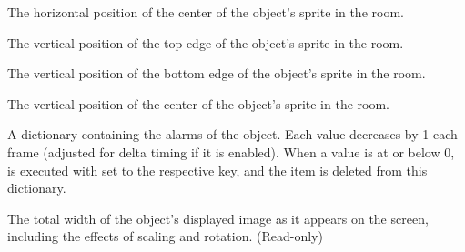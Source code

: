 \documentclass[letterpaper,10pt,english]{sphinxmanual}
\begin{document}
\begin{fulllineitems}
\begin{fulllineitems}
\label{dsp:sge.dsp.Object.image_xcenter}
The horizontal position of the center of the object's sprite in
the room.

\end{fulllineitems}


\begin{fulllineitems}
\label{dsp:sge.dsp.Object.image_top}
The vertical position of the top edge of the object's sprite in
the room.

\end{fulllineitems}


\begin{fulllineitems}
\label{dsp:sge.dsp.Object.image_bottom}
The vertical position of the bottom edge of the object's sprite
in the room.

\end{fulllineitems}


\begin{fulllineitems}
\label{dsp:sge.dsp.Object.image_ycenter}
The vertical position of the center of the object's sprite in the
room.

\end{fulllineitems}


\begin{fulllineitems}
\label{dsp:sge.dsp.Object.alarms}
A dictionary containing the alarms of the object.  Each value
decreases by 1 each frame (adjusted for delta timing if it is
enabled).  When a value is at or below 0, {\hyperref[dsp:sge.dsp.Object.event_alarm]{\emph{}}} is
executed with  set to the respective key, and the
item is deleted from this dictionary.

\end{fulllineitems}


\begin{fulllineitems}
\label{dsp:sge.dsp.Object.image_width}
The total width of the object's displayed image as it appears on
the screen, including the effects of scaling and rotation.
(Read-only)


\end{fulllineitems}
\end{fulllineitems}
\end{document}

